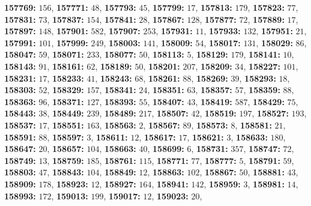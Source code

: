 \textsf{\bfseries 157769:} $156$, \textsf{\bfseries 157771:} $48$, \textsf{\bfseries 157793:} $45$, \textsf{\bfseries 157799:} $17$, \textsf{\bfseries 157813:} $179$, \textsf{\bfseries 157823:} $77$, \textsf{\bfseries 157831:} $73$, \textsf{\bfseries 157837:} $154$, \textsf{\bfseries 157841:} $28$, \textsf{\bfseries 157867:} $128$, \textsf{\bfseries 157877:} $72$, \textsf{\bfseries 157889:} $17$, \textsf{\bfseries 157897:} $148$, \textsf{\bfseries 157901:} $582$, \textsf{\bfseries 157907:} $253$, \textsf{\bfseries 157931:} $11$, \textsf{\bfseries 157933:} $132$, \textsf{\bfseries 157951:} $21$, \textsf{\bfseries 157991:} $101$, \textsf{\bfseries 157999:} $249$, \textsf{\bfseries 158003:} $141$, \textsf{\bfseries 158009:} $54$, \textsf{\bfseries 158017:} $131$, \textsf{\bfseries 158029:} $86$, \textsf{\bfseries 158047:} $59$, \textsf{\bfseries 158071:} $233$, \textsf{\bfseries 158077:} $50$, \textsf{\bfseries 158113:} $5$, \textsf{\bfseries 158129:} $179$, \textsf{\bfseries 158141:} $10$, \textsf{\bfseries 158143:} $91$, \textsf{\bfseries 158161:} $62$, \textsf{\bfseries 158189:} $50$, \textsf{\bfseries 158201:} $207$, \textsf{\bfseries 158209:} $34$, \textsf{\bfseries 158227:} $101$, \textsf{\bfseries 158231:} $17$, \textsf{\bfseries 158233:} $41$, \textsf{\bfseries 158243:} $68$, \textsf{\bfseries 158261:} $88$, \textsf{\bfseries 158269:} $39$, \textsf{\bfseries 158293:} $18$, \textsf{\bfseries 158303:} $52$, \textsf{\bfseries 158329:} $157$, \textsf{\bfseries 158341:} $24$, \textsf{\bfseries 158351:} $63$, \textsf{\bfseries 158357:} $57$, \textsf{\bfseries 158359:} $88$, \textsf{\bfseries 158363:} $96$, \textsf{\bfseries 158371:} $127$, \textsf{\bfseries 158393:} $55$, \textsf{\bfseries 158407:} $43$, \textsf{\bfseries 158419:} $587$, \textsf{\bfseries 158429:} $75$, \textsf{\bfseries 158443:} $38$, \textsf{\bfseries 158449:} $239$, \textsf{\bfseries 158489:} $217$, \textsf{\bfseries 158507:} $42$, \textsf{\bfseries 158519:} $197$, \textsf{\bfseries 158527:} $193$, \textsf{\bfseries 158537:} $17$, \textsf{\bfseries 158551:} $163$, \textsf{\bfseries 158563:} $2$, \textsf{\bfseries 158567:} $89$, \textsf{\bfseries 158573:} $8$, \textsf{\bfseries 158581:} $21$, \textsf{\bfseries 158591:} $88$, \textsf{\bfseries 158597:} $3$, \textsf{\bfseries 158611:} $12$, \textsf{\bfseries 158617:} $17$, \textsf{\bfseries 158621:} $3$, \textsf{\bfseries 158633:} $180$, \textsf{\bfseries 158647:} $20$, \textsf{\bfseries 158657:} $104$, \textsf{\bfseries 158663:} $40$, \textsf{\bfseries 158699:} $6$, \textsf{\bfseries 158731:} $357$, \textsf{\bfseries 158747:} $72$, \textsf{\bfseries 158749:} $13$, \textsf{\bfseries 158759:} $185$, \textsf{\bfseries 158761:} $115$, \textsf{\bfseries 158771:} $77$, \textsf{\bfseries 158777:} $5$, \textsf{\bfseries 158791:} $59$, \textsf{\bfseries 158803:} $47$, \textsf{\bfseries 158843:} $104$, \textsf{\bfseries 158849:} $12$, \textsf{\bfseries 158863:} $102$, \textsf{\bfseries 158867:} $50$, \textsf{\bfseries 158881:} $43$, \textsf{\bfseries 158909:} $178$, \textsf{\bfseries 158923:} $12$, \textsf{\bfseries 158927:} $164$, \textsf{\bfseries 158941:} $142$, \textsf{\bfseries 158959:} $3$, \textsf{\bfseries 158981:} $14$, \textsf{\bfseries 158993:} $172$, \textsf{\bfseries 159013:} $199$, \textsf{\bfseries 159017:} $12$, \textsf{\bfseries 159023:} $20$, 
